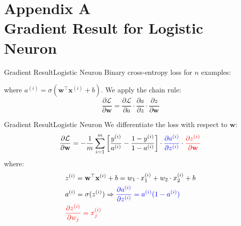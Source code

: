 \documentclass[aspectratio=169]{beamer}
\begin{document}
\section{Appendix A\\ \small{Gradient Result for Logistic Neuron}}
%
\begin{frame}{Gradient Result}{Logistic Neuron}
Binary cross-entropy loss for $n$ examples:
\vspace{0.5cm}
\begin{center}
\end{center}
\vspace{0.5cm}
where $a^{(i)} = \sigma(\mathbf{w}^\top \mathbf{x}^{(i)} + b)$.
\vspace{0.5cm}
We apply the chain rule:
$$
\frac{\partial \mathcal{L}}{\partial \mathbf{w}} = \frac{\partial \mathcal{L}}{\partial a} \cdot \frac{\partial a}{\partial z} \cdot \frac{\partial z}{\partial \mathbf{w}}
$$
\end{frame}
%
%
\begin{frame}{Gradient Result}{Logistic Neuron}
We differentiate the loss with respect to $\mathbf{w}$:
$$
\frac{\partial \mathcal{L}}{\partial \mathbf{w}} = -\frac{1}{m} \sum_{i=1}^m \left[ \frac{y^{(i)}}{a^{(i)}} - \frac{1 - y^{(i)}}{1 - a^{(i)}} \right] \cdot \textcolor{blue}{\frac{\partial a^{(i)}}{\partial z^{(i)}}} \cdot \textcolor{red}{\frac{\partial z^{(i)}}{\partial \mathbf{w}}}
$$
where:
\begin{align*}
&z^{(i)} = \mathbf{w}^\top \mathbf{x}^{(i)} + b = w_1\cdot x_1^{(i)} + w_2 \cdot x_2^{(i)} + b\\
&a^{(i)} = \sigma(z^{(i)}) \Rightarrow \textcolor{blue}{\frac{\partial a^{(i)}}{\partial z^{(i)}} = a^{(i)}(1 - a^{(i)})}\\
&\textcolor{red}{\frac{\partial z^{(i)}}{\partial w_j} = x_j^{(i)}}
\end{align*}
\end{frame}
%
%
\end{document}
